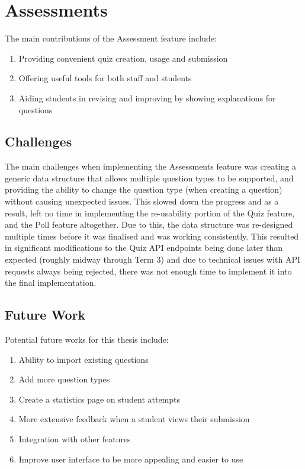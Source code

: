 \section{Assessments}

The main contributions of the Assessment feature include:

\begin{enumerate}
	\item Providing convenient quiz creation, usage and submission
	\item Offering useful tools for both staff and students
	\item Aiding students in revising and improving by showing explanations for questions
\end{enumerate}

\subsection{Challenges}
The main challenges when implementing the Assessments feature was creating a generic data structure that allows multiple question types to be supported, and providing the ability to change the question type (when creating a question) without causing unexpected issues. This slowed down the progress and as a result, left no time in implementing the re-usability portion of the Quiz feature, and the Poll feature altogether. Due to this, the data structure was re-designed multiple times before it was finalised and was working consistently. This resulted in significant modifications to the Quiz API endpoints being done later than expected (roughly midway through Term 3) and due to technical issues with API requests always being rejected, there was not enough time to implement it into the final implementation.

\subsection{Future Work}
Potential future works for this thesis include:

\begin{enumerate}
	\item Ability to import existing questions 
	\item Add more question types
	\item Create a statistics page on student attempts
	\item More extensive feedback when a student views their submission
	\item Integration with other features
	\item Improve user interface to be more appealing and easier to use
\end{enumerate}    